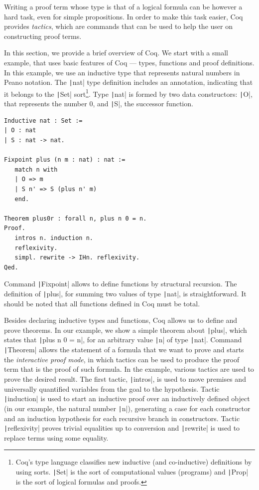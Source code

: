 \documentclass[oneside,12pt]{scrbook}
\theoremstyle{definition}
\newcommand{\coq}[1]{\texttt|#1|}
\theoremstyle{plain}
\theoremstyle{definition}
\begin{document}
Writing a proof term whose type is that of a logical formula can be
however a hard task, even for simple propositions.  In order to make
this task easier, Coq provides \emph{tactics}, which are commands that
can be used to help the user on constructing proof terms.

In this section, we provide a brief overview of Coq. We start with a
small example, that uses basic
features of Coq --- types, functions and proof definitions.  In this
example, we use an inductive type that represents natural numbers in
Peano notation. The \coq{nat} type definition includes an
annotation, indicating that it belongs to the \coq{Set}
sort\footnote{Coq's type language classifies new inductive (and
	co-inductive) definitions by using sorts. \coq{Set} is the sort
	of computational values (programs) and \coq{Prop} is the sort of
	logical formulas and proofs.}. Type \coq{nat} is formed by two
data constructors: \coq{O}, that represents the number $0$, and \coq{S},
the successor function.
\begin{verbatim}
Inductive nat : Set :=
| O : nat
| S : nat -> nat.

Fixpoint plus (n m : nat) : nat :=
   match n with
   | O => m
   | S n' => S (plus n' m)
   end.

Theorem plus0r : forall n, plus n 0 = n.
Proof.
   intros n. induction n.
   reflexivity.
   simpl. rewrite -> IHn. reflexivity.
Qed.
\end{verbatim}   

Command \coq{Fixpoint} allows to define functions by
structural recursion. The definition of \coq{plus}, for summing two
values of type \coq{nat}, is straightforward. It should be noted
that all functions defined in Coq must be total.

Besides declaring inductive types and functions, Coq allows us to
define and prove theorems. In our example, we show a simple theorem
about \coq{plus}, which states that
\coq{plus n 0 = n}, for an arbitrary value \coq{n} of type
\coq{nat}. Command \coq{Theorem} allows the statement of a
formula that we want to prove and starts the \emph{interactive proof mode}, 
in which tactics can be used to produce the proof term that
is the proof of such formula. In the example, various tactics are
used to prove the desired result.  The first tactic, \coq{intros}, is
used to move premises and universally quantified variables from the
goal to the hypothesis. Tactic \coq{induction} is used to start an inductive
proof over an inductively defined object (in our example,
the natural number \coq{n}), generating a case for each constructor and
an induction hypothesis for each recursive branch in constructors.
Tactic \coq{reflexivity} proves trivial equalities up to conversion and
\coq{rewrite} is used to replace terms using some equality. 
\end{document}
